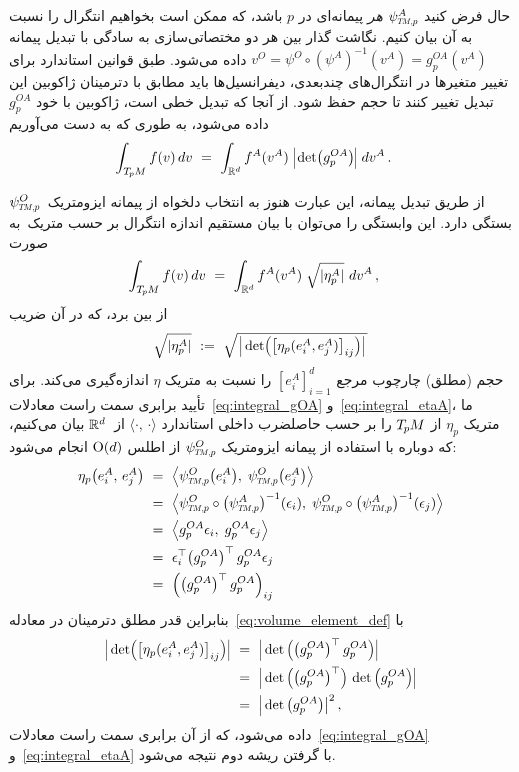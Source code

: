 حال فرض کنید $\psiTMp^A$ \emph{هر} پیمانه‌ای در $p$ باشد، که ممکن است بخواهیم انتگرال را نسبت به آن بیان کنیم.
نگاشت گذار بین هر دو مختصاتی‌سازی به سادگی با تبدیل پیمانه
$v^O = \psi^O \circ (\psi^A )^{-1} (v^A) = g^{OA}_p (v^A)$ داده می‌شود.
طبق قوانین استاندارد برای تغییر متغیرها در انتگرال‌های چندبعدی، دیفرانسیل‌ها باید مطابق با دترمینان ژاکوبین این تبدیل تغییر کنند تا حجم حفظ شود.
از آنجا که تبدیل خطی است، ژاکوبین با خود $g_p^{OA}$ داده می‌شود، به طوری که به دست می‌آوریم
\begin{align}\label{eq:integral_gOA}
    \int_{\TpM} f(v)\, dv
    \ &=\ \int_{\R^d} f^A(v^A)\; \pig|\mkern-2mu \det \!\big(g_p^{OA} \big)\mkern-1mu\pig|\; dv^A \,.
\end{align}


از طریق تبدیل پیمانه، این عبارت هنوز به انتخاب دلخواه از پیمانه ایزومتریک~$\psiTMp^O$ بستگی دارد.
این وابستگی را می‌توان با بیان مستقیم اندازه انتگرال بر حسب متریک~به صورت
\begin{align}\label{eq:integral_etaA}
    \int_{T_{\mkern-1.5mu p}\mkern-.5muM} f(v)\, dv
    \ &=\ \int_{\mathbb{R}^d} f^A(v^A)\; \sqrt{|\eta_p^A|}\ dv^A \,,
\end{align}
از بین برد، که در آن ضریب
\begin{align}\label{eq:volume_element_def}
    \sqrt{|\eta_p^A|}\ :=\ \sqrt{\mkern2mu \pig|\det\!\pig( \big[ \eta_p(e_i^A, e_j^A) \big]_{ij} \pig)\pig| \,}
\end{align}
حجم (مطلق) چارچوب مرجع $[e_i^A]_{i=1}^d$ را نسبت به متریک $\eta$ اندازه‌گیری می‌کند.
برای تأیید برابری سمت راست معادلات~\eqref{eq:integral_gOA} و~\eqref{eq:integral_etaA}، ما متریک $\eta_p$ از $T_{\mkern-1.5mu p}\mkern-.5muM$ را بر حسب حاصلضرب داخلی استاندارد $\langle\cdot,\, \cdot\rangle$ از~$\mathbb{R}^d$ بیان می‌کنیم، که دوباره با استفاده از پیمانه ایزومتریک $\psiTMp^O$ از اطلس $\operatorname{O}(d)$ انجام می‌شود:
\begin{align}
    \eta_p\big( e_i^A,\, e_j^A \big)
    \ &=\ \pig\langle \psiTMp^O\big( e_i^A\big),\; \psiTMp^O\big( e_j^A\big) \pig\rangle \notag \\
    \ &=\ \pig\langle \psiTMp^O \circ \big(\psiTMp^A \big)^{-1} (\epsilon_i),\; \psiTMp^O \circ \big(\psiTMp^A \big)^{-1} (\epsilon_j) \pig\rangle \notag \\
    \ &=\ \pig\langle g_p^{OA} \epsilon_i,\; g_p^{OA} \epsilon_j \pig\rangle \notag \\
    \ &=\ \epsilon_i^\top \big(g_p^{OA} \big)^\top \, g_p^{OA} \epsilon_j \notag \\
    \ &=\ \Big( \big(g_p^{OA} \big)^\top \, g_p^{OA} \Big)_{ij}
\end{align}
بنابراین قدر مطلق دترمینان در معادله~\eqref{eq:volume_element_def} با
\begin{align}
    \pig|\det\!\pig( \big[ \eta_p(e_i^A, e_j^A) \big]_{ij} \pig)\pig|
    \ &=\ \pig| \det\pig( \big(g_p^{OA} \big)^\top \, g_p^{OA} \pig) \pig| \notag \\
    \ &=\ \pig| \det\pig( \big(g_p^{OA} \big)^\top \pig) \, \det\pig( g_p^{OA} \pig) \pig| \notag \\
    \ &=\ \pig| \det\big( g_p^{OA} \big) \big|^2 \,,
\end{align}
داده می‌شود، که از آن برابری سمت راست معادلات~\eqref{eq:integral_gOA} و~\eqref{eq:integral_etaA} با گرفتن ریشه دوم نتیجه می‌شود.


